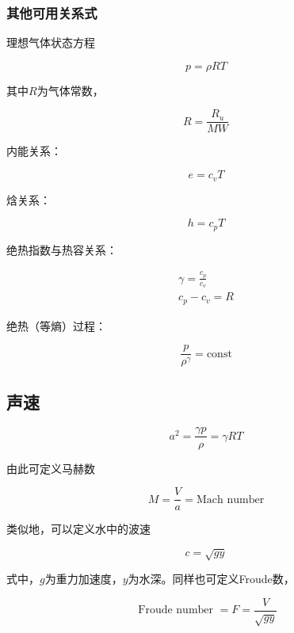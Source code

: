 \subsubsection{其他可用关系式}

理想气体状态方程

\begin{equation*}
    p=\rho RT
\end{equation*}

其中$R$为气体常数，

\begin{equation*}
    R=\frac{R_u}{MW}
\end{equation*}

内能关系：

\begin{equation*}
    e=c_vT
\end{equation*}

焓关系：

\begin{equation*}
    h=c_pT
\end{equation*}

绝热指数与热容关系：

\begin{gather*}
    \gamma=\frac{c_p}{c_v}\\
    c_p-c_v=R
\end{gather*}

绝热（等熵）过程：

\begin{equation*}
    \frac{p}{\rho^\gamma}=\mbox{const}
\end{equation*}


\subsection{声速}

\begin{equation*}
    a^{2}=\frac{\gamma p}{\rho}=\gamma R T
\end{equation*}

由此可定义马赫数

\begin{equation*}
    M=\frac{V}{a}=\mbox{Mach number}
\end{equation*}

类似地，可以定义水中的波速

\begin{equation*}
    c=\sqrt{gy}
\end{equation*}

式中，$g$为重力加速度，$y$为水深。同样也可定义Froude数，

\begin{equation*}
    \mbox { Froude number }=F=\frac{V}{\sqrt{g y}}
\end{equation*}